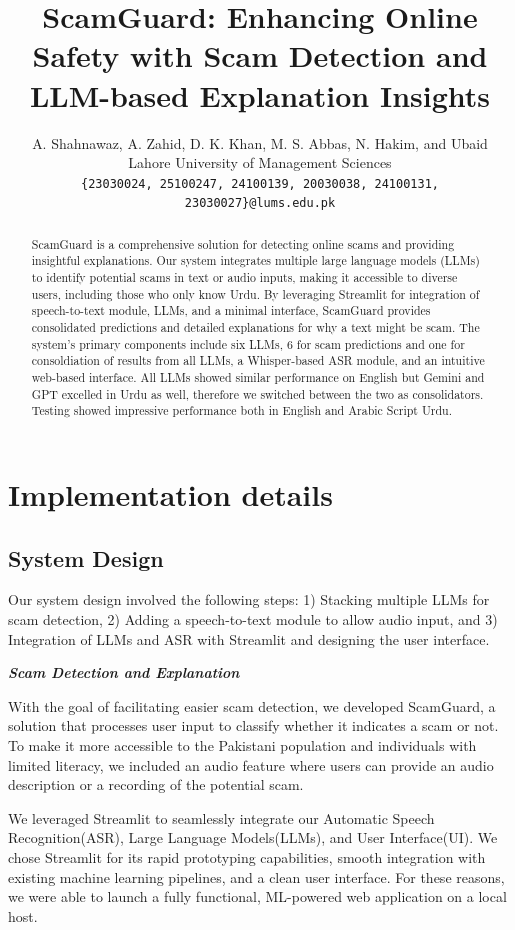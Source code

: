 \documentclass[11pt]{article}
\title{ScamGuard: Enhancing Online Safety with Scam Detection and LLM-based Explanation Insights}
\author{A. Shahnawaz, A. Zahid, D. K. Khan, M. S. Abbas, N. Hakim, and Ubaid \\
  Lahore University of Management Sciences
\\
  {\tt \{23030024, 25100247, 24100139, 20030038, 24100131, 23030027\}@lums.edu.pk} \\
}
\date{}
\begin{document}
\maketitle
\begin{abstract}
    ScamGuard is a comprehensive solution for detecting online scams and providing insightful explanations. Our system integrates multiple large language models (LLMs) to identify potential scams in text or audio inputs, making it accessible to diverse users, including those who only know Urdu. By leveraging Streamlit for integration of speech-to-text module, LLMs, and a minimal interface, ScamGuard provides consolidated predictions and detailed explanations for why a text might be scam. The system's primary components include six LLMs, 6 for scam predictions and one for consoldiation of results from all LLMs, a Whisper-based ASR module, and an intuitive web-based interface. All LLMs showed similar performance on English but Gemini and GPT excelled in Urdu as well, therefore we switched between the two as consolidators. Testing showed impressive performance both in English and Arabic Script Urdu.
\end{abstract}

\section{Implementation details}
\subsection{System Design}

Our system design involved the following steps: 1) Stacking multiple LLMs for scam detection, 2) Adding a speech-to-text module to allow audio input, and 3) Integration of LLMs and ASR with Streamlit and designing the user interface.

{\textbf{\textit{Scam Detection and Explanation}}}

With the goal of facilitating easier scam detection, we developed ScamGuard, a solution that processes user input to classify whether it indicates a scam or not. To make it more accessible to the Pakistani population and individuals with limited literacy, we included an audio feature where users can provide an audio description or a recording of the potential scam.

We leveraged Streamlit to seamlessly integrate our Automatic Speech Recognition(ASR), Large Language Models(LLMs), and User Interface(UI). We chose Streamlit for its rapid prototyping capabilities, smooth integration with existing machine learning pipelines, and a clean user interface. For these reasons, we were able to launch a fully functional, ML-powered web application on a local host.
\end{document}

